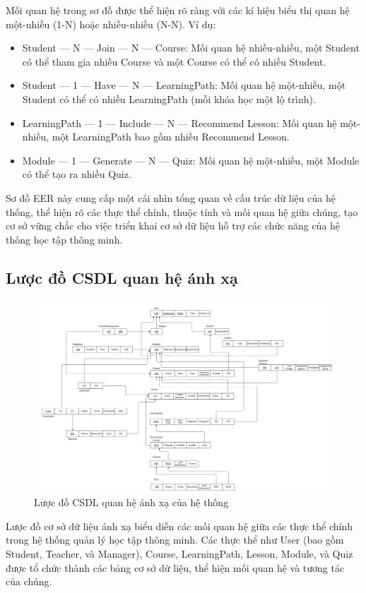 Mối quan hệ trong sơ đồ được thể hiện rõ ràng với các kí hiệu biểu thị quan hệ một-nhiều (1-N) hoặc nhiều-nhiều (N-N). Ví dụ:
\begin{itemize}
\item Student — N — Join — N — Course: Mối quan hệ nhiều-nhiều, một Student có thể tham gia nhiều Course và một Course có thể có nhiều Student.
\item Student — 1 — Have — N — LearningPath: Mối quan hệ một-nhiều, một Student có thể có nhiều LearningPath (mỗi khóa học một lộ trình).
\item LearningPath — 1 — Include — N — Recommend Lesson: Mối quan hệ một-nhiều, một LearningPath bao gồm nhiều Recommend Lesson.
\item Module — 1 — Generate — N — Quiz: Mối quan hệ một-nhiều, một Module có thể tạo ra nhiều Quiz.
\end{itemize}
Sơ đồ EER này cung cấp một cái nhìn tổng quan về cấu trúc dữ liệu của hệ thống, thể hiện rõ các thực thể chính, thuộc tính và mối quan hệ giữa chúng, tạo cơ sở vững chắc cho việc triển khai cơ sở dữ liệu hỗ trợ các chức năng của hệ thống học tập thông minh.
\newpage
\subsection{Lược đồ CSDL quan hệ ánh xạ}
\begin{figure}[h!]
    \centering
    \includegraphics[width=\linewidth]{Images/Anh/mapping.png}
    \caption{Lược đồ CSDL quan hệ ánh xạ của hệ thống}
    \label{fig:enter-label}
\end{figure}
Lược đồ cơ sở dữ liệu ánh xạ biểu diễn các mối quan hệ giữa các thực thể chính trong hệ thống quản lý học tập thông minh. Các thực thể như User (bao gồm Student, Teacher, và Manager), Course, LearningPath, Lesson, Module, và Quiz được tổ chức thành các bảng cơ sở dữ liệu, thể hiện mối quan hệ và tương tác của chúng.

